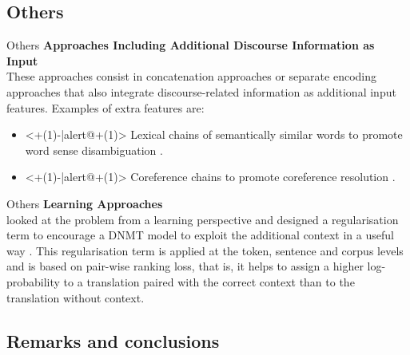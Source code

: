 \subsection{Others}

\begin{frame}{Others}
	\textbf{Approaches Including Additional Discourse Information as Input}\\
	These approaches consist in concatenation approaches or separate encoding approaches that also integrate discourse-related information as additional input features. Examples of extra features are:
	\begin{itemize}
		\item<+(1)-|alert@+(1)> Lexical chains of semantically similar words to promote word sense disambiguation \cite{rios_gonzales_improving_2017}.
		\item<+(1)-|alert@+(1)> Coreference chains to promote coreference resolution \cite{stojanovski_coreference_2018, ohtani_context-aware_2019}.
	\end{itemize}
\end{frame}

\begin{frame}{Others}
	\textbf{Learning Approaches}\\
	 \cite{jean_context-aware_2019} looked at the problem from a learning perspective and designed a regularisation term
to encourage a DNMT model to exploit the additional context in a useful way . This regularisation
term is applied at the token, sentence and corpus levels and is based on pair-wise ranking loss,
that is, it helps to assign a higher log-probability to a translation paired with the correct context
than to the translation without context.
\end{frame}

\subsection{Remarks and conclusions}

